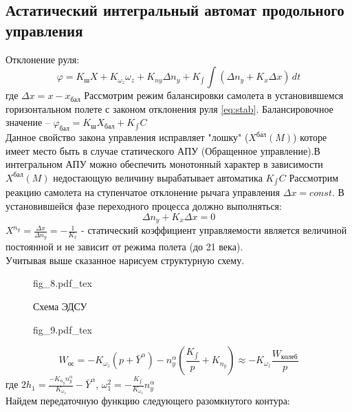 \documentclass{article}
\begin{document}
\subsection{Астатический интегральный автомат продольного управления}
Отклонение руля:
\begin{equation}
\varphi = K_ш X + K_{\omega_z} \omega_z + K_{ny} \Delta n_y + K_{\int} \int (\Delta n_y + K_x \Delta x) \, dt
\label{eq:stab}
\end{equation}
где $\Delta x = x - x_{бал}$
Рассмотрим режим балансировки самолета в установившемся горизонтальном полете с законом отклонения руля \eqref{eq:stab}.
Балансировочное значение -- $\varphi_{бал} = K_ш X_{бал} + K_{\int} C$\\
Данное свойство закона управления исправляет "лошку" ($X^{бал}(M)$) которе имеет место быть в случае статического АПУ (Обращенное управление).В интегральном АПУ можно обеспечить монотонный характер в зависимости $X^{бал} (M)$ недостающую величину вырабатывает автоматика $K_{\int}C$
Рассмотрим реакцию самолета на ступенчатое отклонение рычага управления $\Delta x = const$. В установившейся фазе переходного процесса должно выполняться:
\[
\Delta n_y + K_x \Delta x = 0
\]
$ X^{n_y} = \frac{\Delta x}{\Delta n_y} = -\frac{1}{K_x} $ - статический коэффициент управляемости является величиной постоянной и не зависит от режима полета (до 21 века). \\
Учитывая выше сказанное нарисуем структурную схему.\\ 
\begin{figure}[H]
\begin{minipage}{\textwidth}
    \centering
{fig_8.pdf_tex}
\end{minipage}
\caption{Схема ЭДСУ}
\end{figure}

\begin{figure}[H]
\begin{minipage}{\textwidth}
    \centering
{fig_9.pdf_tex}
\end{minipage}
\end{figure}


\[
W_{ос} = -K_{\omega_z} (p+\bar{Y}^\alpha) - n_y^\alpha (\frac{K_{\int}}{p} + K_{n_y})
\approx -K_{\omega_z}\frac{W_{колеб}}{p}
\]
где $2h_1 = \frac{-K_{n_y} n_y^\alpha}{K_{\omega_z}} - \bar{Y}^\alpha$, $\omega_1^2 = -\frac{K_{\int}} {K_{\omega_z}} n_y^\alpha $\\
Найдем передаточную функцию следующего разомкнутого контура:
\end{document}
